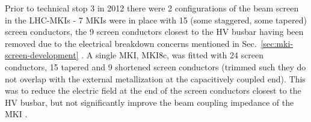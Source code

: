 Prior to technical stop 3 in 2012 there were 2 configurations of the beam screen in the LHC-MKIs - 7 MKIs were in place with 15 (some staggered, some tapered) screen conductors, the 9 screen conductors closest to the HV busbar having been removed due to the electrical breakdown concerns mentioned in Sec.~\ref{sec:mki-screen-development} \cite{Barnes:improvBeamScreen}. A single MKI, MKI8c, was fitted with 24 screen conductors, 15 tapered and 9 shortened screen conductors (trimmed such they do not overlap with the external metallization at the capacitively coupled end). This was to reduce the electric field at the end of the screen conductors closest to the HV busbar, but not significantly improve the beam coupling impedance of the MKI \cite{Barnes:improvBeamScreen}.